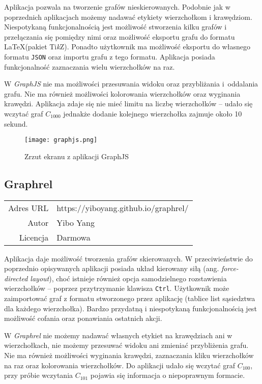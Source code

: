 Aplikacja pozwala na tworzenie grafów nieskierowanych. Podobnie jak w poprzednich aplikacjach możemy nadawać etykiety wierzchołkom i krawędziom. Niespotykaną funkcjonalnością jest możliwość stworzenia kilku grafów i przełączania się pomiędzy nimi oraz możliwość eksportu grafu do formatu \LaTeX (pakiet Ti\textit{k}Z). Ponadto użytkownik ma możliwość eksportu do własnego formatu \texttt{JSON} oraz importu grafu z tego formatu. Aplikacja posiada funkcjonalność zaznaczania wielu wierzchołków na raz.

W \textit{GraphJS} nie ma możliwości przesuwania widoku oraz przybliżania i~oddalania grafu. Nie ma również możliwości kolorowania wierzchołków oraz wyginania krawędzi. Aplikacja zdaje się nie mieć limitu na liczbę wierzchołków -- udało się wczytać graf $C_{1000}$ jednakże dodanie kolejnego wierzchołka zajmuje około 10 sekund.

\begin{figure}[H]
\centering
\texttt{[image: graphjs.png]}
\caption{Zrzut ekranu z aplikacji GraphJS}
\end{figure}


\subsection*{Graphrel}
\bigskip
\noindent\begin{tabularx}{\textwidth}{r|X|}
\cline{2-2}
  Adres URL & https://yiboyang.github.io/graphrel/ \\ 
\cline{2-2} 
 Autor & Yibo Yang \\
\cline{2-2}
 Licencja & Darmowa\\  
\cline{2-2}
\end{tabularx} 
\bigskip

Aplikacja daje możliwość tworzenia grafów skierowanych. W przeciwieństwie do poprzednio opisywanych aplikacji posiada układ kierowany siłą (ang. \textit{force-directed layout}), choć istnieje również opcja samodzielnego rozstawienia wierzchołków -- poprzez przytrzymanie klawisza \texttt{Ctrl}. Użytkownik może zaimportować graf z formatu stworzonego przez aplikację (tablice list sąsiedztwa dla każdego wierzchołka). Bardzo przydatną i niespotykaną funkcjonalnością jest możliwość cofania oraz ponawiania ostatnich akcji. 

W \textit{Graphrel} nie możemy nadawać własnych etykiet na krawędziach ani w wierzchołkach, nie możemy przesuwać widoku ani zmieniać przybliżenia grafu. Nie ma również możliwości wyginania krawędzi, zaznaczania kliku wierzchołków na raz oraz kolorowania wierzchołków. Do aplikacji udało się wczytać graf $C_{100}$, przy próbie wczytania $C_{101}$ pojawia się informacja o niepoprawnym formacie.

